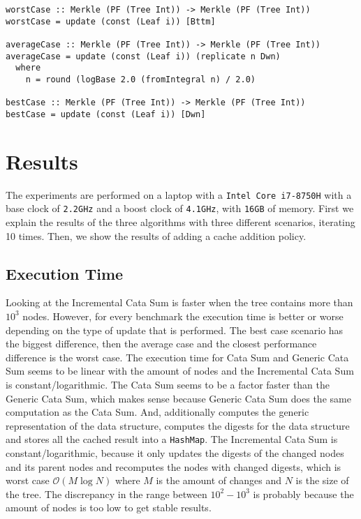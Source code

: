 \begin{verbatim}
worstCase :: Merkle (PF (Tree Int)) -> Merkle (PF (Tree Int))
worstCase = update (const (Leaf i)) [Bttm]

averageCase :: Merkle (PF (Tree Int)) -> Merkle (PF (Tree Int))
averageCase = update (const (Leaf i)) (replicate n Dwn)
  where
    n = round (logBase 2.0 (fromIntegral n) / 2.0)

bestCase :: Merkle (PF (Tree Int)) -> Merkle (PF (Tree Int))
bestCase = update (const (Leaf i)) [Dwn]
\end{verbatim}

\section{Results}

The experiments are performed on a laptop with a \texttt{Intel Core i7-8750H} with a base clock of \texttt{2.2GHz} and a boost clock of \texttt{4.1GHz}, with \texttt{16GB} of memory. First we explain the results of the three algorithms with three different scenarios, iterating 10 times. Then, we show the results of adding a cache addition policy.

\subsection{Execution Time}
Looking at  the Incremental Cata Sum is faster when the tree contains more than $10^3$ nodes. However, for every benchmark the execution time is better or worse depending on the type of update that is performed. The best case scenario has the biggest difference, then the average case and the closest performance difference is the worst case. The execution time for Cata Sum and Generic Cata Sum seems to be linear with the amount of nodes and the Incremental Cata Sum is constant/logarithmic. The Cata Sum seems to be a factor faster than the Generic Cata Sum, which makes sense because Generic Cata Sum does the same computation as the Cata Sum. And, additionally computes the generic representation of the data structure, computes the digests for the data structure and stores all the cached result into a \texttt{HashMap}. The Incremental Cata Sum is constant/logarithmic, because it only updates the digests of the changed nodes and its parent nodes and recomputes the nodes with changed digests, which is worst case $\mathcal{O}(M \log{N})$ where $M$ is the amount of changes and $N$ is the size of the tree. The discrepancy in the range between $10^2 - 10^3$ is probably because the amount of nodes is too low to get stable results.

